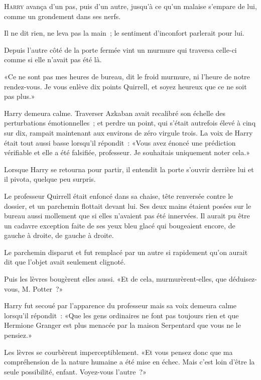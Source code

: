 
\lettrine{H}{arry} avança d'un pas, puis d'un autre, jusqu'à ce qu'un malaise s'empare de lui, comme un grondement dans ses nerfs.

Il ne dit rien, ne leva pas la main~; le sentiment d'inconfort parlerait pour lui.

Depuis l'autre côté de la porte fermée vint un murmure qui traversa celle-ci comme si elle n'avait pas été là.

«Ce ne sont pas mes heures de bureau, dit le froid murmure, ni l'heure de notre rendez-vous. Je vous enlève dix points Quirrell, et soyez heureux que ce ne soit pas plus.»

Harry demeura calme. Traverser Azkaban avait recalibré son échelle des perturbations émotionnelles~; et perdre un point, qui s'était autrefois élevé à cinq sur dix, rampait maintenant aux environs de zéro virgule trois. La voix de Harry était tout aussi basse lorsqu'il répondit~: «Vous avez énoncé une prédiction vérifiable et elle a été falsifiée, professeur. Je souhaitais uniquement noter cela.»

Lorsque Harry se retourna pour partir, il entendit la porte s'ouvrir derrière lui et il pivota, quelque peu surpris.

Le professeur Quirrell était enfoncé dans sa chaise, tête renversée contre le dossier, et un parchemin flottait devant lui. Ses deux mains étaient posées sur le bureau aussi mollement que si elles n'avaient pas été innervées. Il aurait pu être un cadavre exception faite de ses yeux bleu glacé qui bougeaient encore, de gauche à droite, de gauche à droite.

Le parchemin disparut et fut remplacé par un autre si rapidement qu'on aurait dit que l'objet avait seulement clignoté.

Puis les lèvres bougèrent elles aussi. «Et de cela, murmurèrent-elles, que déduisez-vous, M. Potter~?»

Harry fut secoué par l'apparence du professeur mais sa voix demeura calme lorsqu'il répondit~: «Que les gens ordinaires ne font pas toujours rien et que Hermione Granger est plus menacée par la maison Serpentard que vous ne le pensiez.»

Les lèvres se courbèrent imperceptiblement. «Et vous pensez donc que ma compréhension de la nature humaine a été mise en échec. Mais c'est loin d'être la seule possibilité, enfant. Voyez-vous l'autre~?»

